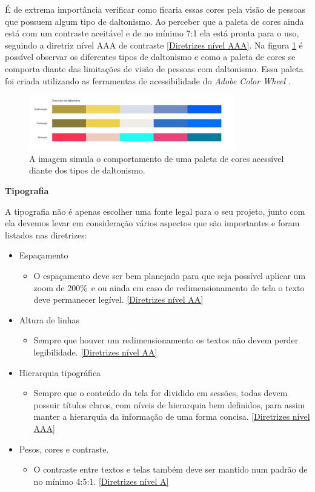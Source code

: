 {É de extrema importância verificar como ficaria essas cores pela visão de pessoas que possuem algum tipo de daltonismo. Ao perceber que a paleta de cores ainda está com um contraste aceitável e de no mínimo 7:1 ela está pronta para o uso, seguindo a diretriz nível AAA de contraste \ref{Diretrizes nível AAA}. Na figura \ref{fig2:style} é possível observar os diferentes tipos de daltonismo e como a paleta de cores se comporta diante das limitações de visão de pessoas com daltonismo. Essa paleta foi criada utilizando as ferramentas de acessibilidade do \textit{Adobe Color Wheel} \cite{ADOBE}.
 \begin{figure}[ht]
        \centering
    	\includegraphics[width=0.8\textwidth]{images/paleta_daltonismo.png}
        \caption{A imagem simula o comportamento de uma paleta de cores acessível diante dos tipos de daltonismo.}
        \label{fig2:style}
\end{figure}  


\newpage

{\centerline{\textbf{Tipografia}}}
A tipografia não é apenas escolher uma fonte legal para o seu projeto, junto com ela devemos levar em consideração vários aspectos que são importantes e foram listados nas diretrizes: 
\begin{itemize}
    \item Espaçamento
    \begin{itemize}
        \item O espaçamento deve ser bem planejado para que seja possível aplicar um zoom de 200\%\ e ou ainda em caso de redimensionamento de tela o texto deve permanecer legível. \ref{Diretrizes nível AA}
    \end{itemize}
    \item Altura de linhas
    \begin{itemize}
        \item Sempre que houver um redimensionamento os textos não devem perder legibilidade. \ref{Diretrizes nível AA}
    \end{itemize}
    \item Hierarquia tipográfica
    \begin{itemize}
        \item Sempre que o conteúdo da tela for dividido em sessões, todas devem possuir títulos claros, com níveis de hierarquia bem definidos, para assim manter a hierarquia da informação de uma forma concisa. \ref{Diretrizes nível AAA}
    \end{itemize}
    \item Pesos, cores e contraste. 
    \begin{itemize}
        \item O contraste entre textos e telas também deve ser mantido num padrão de no mínimo 4:5:1. \ref{Diretrizes nível A}
    \end{itemize}
\end{itemize}

}
